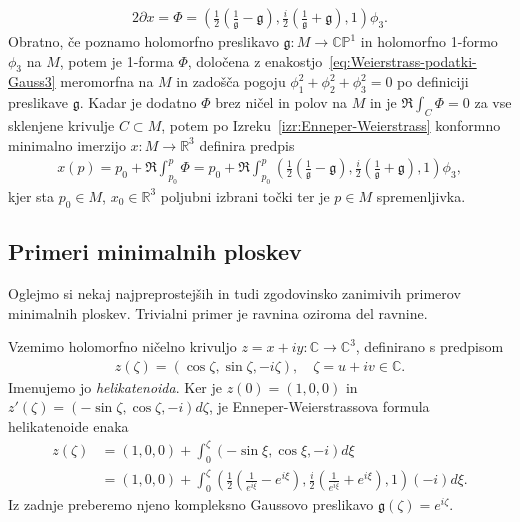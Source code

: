 \documentclass[12pt,a4paper,twoside]{article}
\theoremstyle{definition} %
\theoremstyle{plain} %
\numberwithin{equation}{section}  %
\begin{document}
\begin{gather} \label{eq:Weierstrass-podatki-Gauss3}
2 \partial x = \Phi = \left( \frac{1}{2} \left(\frac{1}{\mathfrak{g}} - \mathfrak{g} \right), \frac{i}{2} \left(\frac{1}{\mathfrak{g}} + \mathfrak{g} \right), 1 \right) \phi_3.
\end{gather}
Obratno, če poznamo holomorfno preslikavo $\mathfrak{g} \colon M \to \mathbb{CP}^{1}$ in holomorfno 1-formo $\phi_3$ na $M$, potem je 1-forma $\Phi$, določena z enakostjo~\ref{eq:Weierstrass-podatki-Gauss3} meromorfna na $M$ in zadošča pogoju $\phi_{1}^2 + \phi_{2}^2 + \phi_{3}^2 = 0$ po definiciji preslikave $\mathfrak{g}$.
Kadar je dodatno $\Phi$ brez ničel in polov na $M$ in je $\Re \int_{C} \Phi = 0$ za vse sklenjene krivulje $C \subset M$, potem po Izreku~\ref{izr:Enneper-Weierstrass} konformno minimalno imerzijo $x \colon M \to \mathbb{R}^3$ definira predpis
\begin{gather}
x(p) = p_{0} + \Re \int_{p_0}^{p} \Phi = p_{0} + \Re \int_{p_0}^{p} \left( \frac{1}{2} \left(\frac{1}{\mathfrak{g}} - \mathfrak{g} \right), \frac{i}{2} \left(\frac{1}{\mathfrak{g}} + \mathfrak{g} \right), 1 \right) \phi_3,
\end{gather}
kjer sta $p_0 \in M$, $x_0 \in \mathbb{R}^3$ poljubni izbrani točki ter je $p \in M$ spremenljivka.

\subsection{Primeri minimalnih ploskev}
%
Oglejmo si nekaj najpreprostejših in tudi zgodovinsko zanimivih primerov minimalnih ploskev.
Trivialni primer je ravnina oziroma del ravnine.

Vzemimo holomorfno ničelno krivuljo $z = x + iy \colon \mathbb{C} \to \mathbb{C}^3$, definirano s predpisom
\begin{gather} \label{eq:helikatenoida}
z(\zeta) = (\cos \zeta, \sin \zeta, -i\zeta), \quad \zeta = u + iv \in \mathbb{C}.
\end{gather} 
Imenujemo jo \emph{helikatenoida}.
Ker je $z(0) = (1,0,0)$ in $z'(\zeta) = (-\sin \zeta, \cos \zeta, -i) d\zeta$, je Enneper-Weierstrassova formula helikatenoide enaka
\begin{align} \label{eq:EP-helikatenoida}
z(\zeta) &= (1,0,0) + \int_{0}^{\zeta} (-\sin \xi, \cos \xi, -i) d\xi \nonumber \\
	&= (1,0,0) + \int_{0}^{\zeta} \left( \frac{1}{2} \left(\frac{1}{e^{i\xi}} - e^{i\xi} \right), \frac{i}{2} \left(\frac{1}{e^{i\xi}} + e^{i\xi} \right), 1 \right) (-i) d\xi.
\end{align}
Iz zadnje preberemo njeno kompleksno Gaussovo preslikavo $\mathfrak{g}(\zeta) = e^{i\zeta}$.
\end{document}

